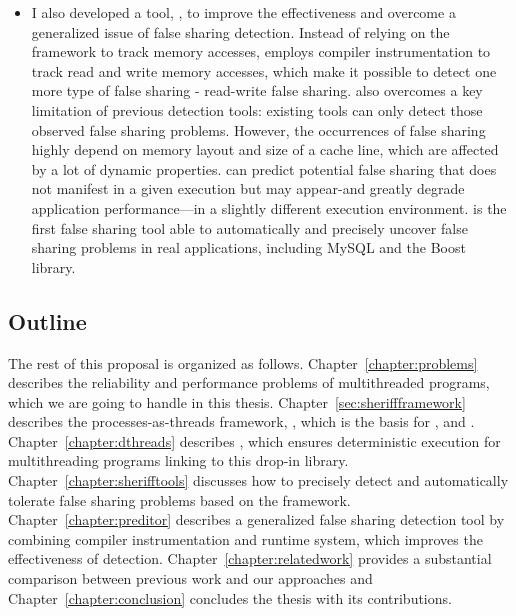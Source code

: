 \begin{itemize}
\item I also developed a tool, \predator{}, to improve the effectiveness and overcome a generalized issue of false sharing detection. Instead of relying on the \sheriff{} framework to track memory accesses, \predator{} employs compiler instrumentation to track read and write memory accesses, which make it possible to detect one more type of false sharing - read-write false sharing. \Predator{} also overcomes a key limitation of previous detection tools: existing tools can only detect those observed false sharing problems. However, the occurrences of false sharing highly depend on memory layout and size of a cache line, which are affected by a lot of dynamic properties. \Predator{} can predict potential false sharing that does not manifest in a given execution but may appear-and greatly degrade application performance—in a slightly different execution environment. \Predator{} is the first false sharing tool able to automatically and precisely uncover false sharing problems in real applications, including MySQL and the Boost library.


\end{itemize}

\subsection*{Outline}
The rest of this proposal is organized as follows. Chapter~\ref{chapter:problems} describes the reliability and performance problems of multithreaded programs, which we are going to handle in this thesis. Chapter~\ref{sec:sheriffframework} describes the processes-as-threads framework, \sheriff{}, which is the basis for \dthreads{}, \SheriffDetect{} and \SheriffProtect{}. Chapter~\ref{chapter:dthreads} describes \dthreads{}, which ensures deterministic execution for multithreading programs linking to this drop-in library. Chapter~\ref{chapter:sherifftools} discusses how to precisely detect and automatically tolerate false sharing problems based on the \sheriff{} framework. Chapter~\ref{chapter:preditor} describes a generalized false sharing detection tool by combining compiler instrumentation and runtime system, which improves the effectiveness of detection. 
Chapter~\ref{chapter:relatedwork} provides a substantial comparison between previous work and our approaches and Chapter~\ref{chapter:conclusion} concludes the thesis with its contributions. 




